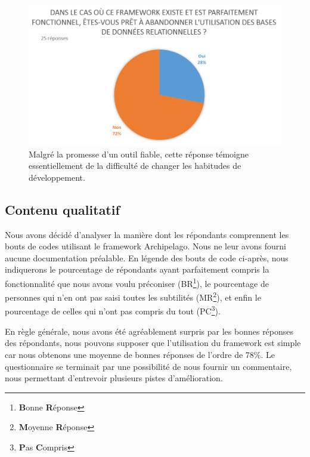 \documentclass[a4paper,fleqn,12pt,oneside]{book}
\begin{document}
\begin{figure}[!ht]
\centering
\includegraphics[scale=0.8]{figures/QAbanFilt.png}
\caption{Malgré la promesse d'un outil fiable, cette réponse témoigne essentiellement de la difficulté de changer les habitudes de développement.}
\label{fig:QAbanFilt}
\end{figure}



\subsection{Contenu qualitatif}
Nous avons décidé d'analyser la manière dont les répondants comprennent les bouts de codes utilisant le framework Archipelago. Nous ne leur avons fourni aucune documentation préalable. En légende des bouts de code ci-après, nous indiquerons le pourcentage de répondants ayant parfaitement compris la fonctionnalité que nous avons voulu préconiser (BR\footnote{\textbf{B}onne \textbf{R}éponse}), le pourcentage de personnes qui n'en ont pas saisi toutes les subtilités (MR\footnote{\textbf{M}oyenne \textbf{R}éponse}), et enfin
le pourcentage de celles qui n'ont pas compris du tout (PC\footnote{\textbf{P}as \textbf{C}ompris}).

En règle générale, nous avons été agréablement surpris par les bonnes réponses des répondants, nous pouvons supposer que l'utilisation du framework est simple car nous obtenons une moyenne de bonnes réponses de l'ordre de 78\%. Le questionnaire se terminait par une possibilité de nous fournir un commentaire, nous permettant d'entrevoir plusieurs pistes d'amélioration.
\end{document}
